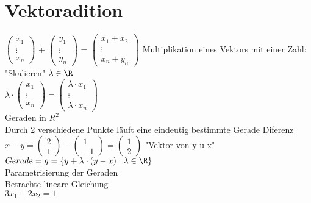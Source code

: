 \section*{Vektoradition}
$\left( \begin{array}{c}x_1 \\ \vdots \\ x_n\end{array} \right)$ + 
$\left( \begin{array}{c}y_1 \\ \vdots \\ y_n\end{array} \right)$ = 
$\left( \begin{array}{c}x_1 + x_2 \\ \vdots \\ x_n + y_n\end{array} \right)$
Multiplikation eines Vektors mit einer Zahl: "Skalieren"
$\lambda \in \R$\\
$\lambda \cdot \left( \begin{array}{c}x_1 \\ \vdots \\ x_n\end{array} \right) = \left( \begin{array}{c}\lambda \cdot x_1 \\ \vdots \\ \lambda \cdot x_n\end{array} \right)$\\
Geraden in $R^2$\\
Durch 2 verschiedene Punkte läuft eine eindeutig bestimmte Gerade
Diferenz $x - y = \left( \begin{array}{c}2 \\ 1\end{array} \right) - \left( \begin{array}{c}1 \\ -1\end{array} \right) = \left( \begin{array}{c}1 \\ 2\end{array} \right)$
"Vektor von y u x"\\
$Gerade = g = \{y + \lambda \cdot (y - x) \mid \lambda \in \R\}$\\
Parametrisierung der Geraden\\
Betrachte lineare Gleichung\\
$3x_1 - 2x_2 = 1$\\
